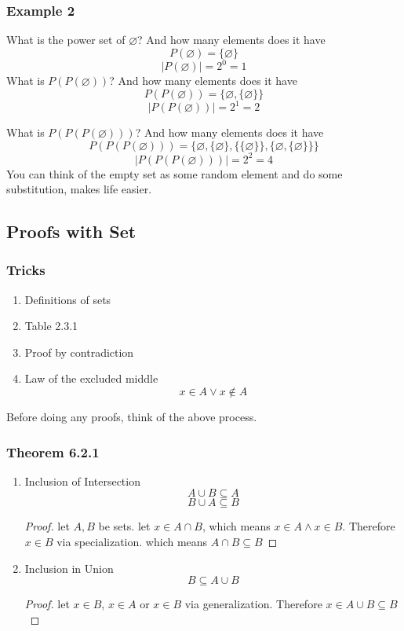 \documentclass[12pt]{book}
\newcommand{\paren}[1]{\left( #1 \right)}
\newcommand{\abso}[1]{\left|#1 \right|}
\begin{document}
    \subsubsection{Example 2}
    What is the power set of $\varnothing$? And how many elements does it have
    \[
    P(\varnothing) = \{ \varnothing \}
    \]
    \[
    \abso{P\paren{\varnothing}} = 2^0 = 1
    \]
    What is $P\paren{P\paren{\varnothing}}$? And how many elements does it have
    \[
    P\paren{P\paren{\varnothing}} = \{ \varnothing, \{ \varnothing \} \}
    \]
    \[
    \abso{P\paren{P\paren{\varnothing}}} = 2^1 = 2
    \]
    
    What is $P\paren{P\paren{P\paren{\varnothing}}}$? And how many elements does it have
    \[
    P\paren{P\paren{P\paren{\varnothing}}} = 
    \{ \varnothing, \{\varnothing\} , \{\{ \varnothing \}\}, \{ \varnothing, \{ \varnothing \}\}\}
    \]
    \[
    \abso{P\paren{P\paren{P\paren{\varnothing}}}} = 2^2 = 4
    \]
    You can think of the empty set as some random element and do some substitution, makes life easier.

\subsection{Proofs with Set}
    \subsubsection{Tricks}
        \begin{enumerate}
            \item Definitions of sets
            \item Table 2.3.1
            \item Proof by contradiction
            \item Law of the excluded middle
            \[
            x \in A \vee x \notin A
            \]
        \end{enumerate}
    Before doing any proofs, think of the above process.
    \subsubsection{Theorem 6.2.1}
        \begin{enumerate}
            \item Inclusion of Intersection
                \[
                A\cup B \subseteq A
                \]
                \[
                B \cup A \subseteq B
                \]
                \begin{proof}
                let $A,B$ be sets.  let $x \in A \cap B$, which means $x\in A \wedge x\in B$. Therefore $x \in B$ via specialization. which means $A \cap B \subseteq B$
                \end{proof}
            \item Inclusion in Union
                \[
                B \subseteq A \cup B
                \]
                \begin{proof}
                    let $x \in B$, $x \in A$ or $x \in B$ via generalization. Therefore $x \in A \cup B \subseteq B$
                \end{proof}
        \end{enumerate}
\end{document}
